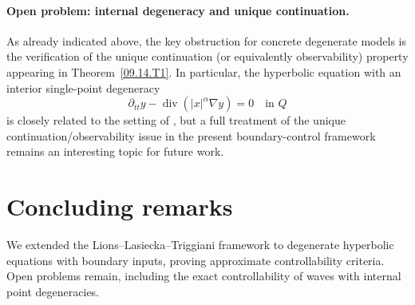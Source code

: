 \documentclass[preprint,12pt]{elsarticle}
\theoremstyle{definition}   %
\numberwithin{equation}{section}
\def\pt{\partial}
\def\pt{\partial}
\DeclareMathOperator{\Div}{div}
\begin{document}
\paragraph*{Open problem: internal degeneracy and unique continuation.}
As already indicated above, the key obstruction for concrete degenerate models is the verification of the unique continuation (or equivalently observability) property appearing in Theorem~\ref{09.14.T1}.
In particular, the hyperbolic equation with an interior single-point degeneracy
\begin{equation}\label{eq:singlepoint-degenerate-model}
	\pt_{tt}y-\Div(|x|^\alpha\nabla y)=0 \quad \mbox{in } Q
\end{equation}
is closely related to the setting of \cite{Yang1}, but a full treatment of the unique continuation/observability issue in the present boundary-control framework remains an interesting topic for future work.

\section{Concluding remarks}
We extended the Lions–Lasiecka–Triggiani framework to degenerate hyperbolic equations with boundary inputs, proving approximate controllability criteria. Open problems remain, including the exact controllability of waves with internal point degeneracies.


\end{document}
